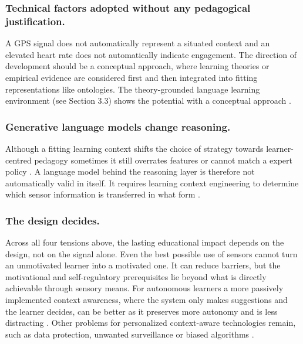 \documentclass[runningheads]{llncs}
\begin{document}
\subsubsection{Technical factors adopted without any pedagogical justification.}
A GPS signal does not automatically represent a situated context and an elevated heart rate does not automatically indicate engagement. The direction of development should be a conceptual approach, where learning theories or empirical evidence are considered first and then integrated into fitting representations like ontologies. The theory-grounded language learning environment (see Section 3.3) shows the potential with a conceptual approach \cite{liu_effect_2026}.
\subsubsection{Generative language models change reasoning.}
Although a fitting learning context shifts the choice of strategy towards learner-centred pedagogy sometimes it still overrates features or cannot match a expert policy \cite{hatchett_learning_2026}.
A language model behind the reasoning layer is therefore not automatically valid in itself. It requires learning context engineering to determine which sensor information is transferred in what form \cite{schuring_generating_2025}.
\subsubsection{The design decides.} Across all four tensions above, the lasting educational impact depends on the design, not on the signal alone. Even the best possible use of sensors cannot turn an unmotivated learner into a motivated one. It can reduce barriers, but the motivational and self-regulatory prerequisites lie beyond what is directly achievable through sensory means. For autonomous learners a more passively implemented context awareness, where the system only makes suggestions and the learner decides, can be better as it preserves more autonomy and is less distracting \cite{perera_context_2014}. Other problems for personalized context-aware technologies remain, such as data protection, unwanted surveillance or biased algorithms  \cite{hong_advances_2025}.
\end{document}
